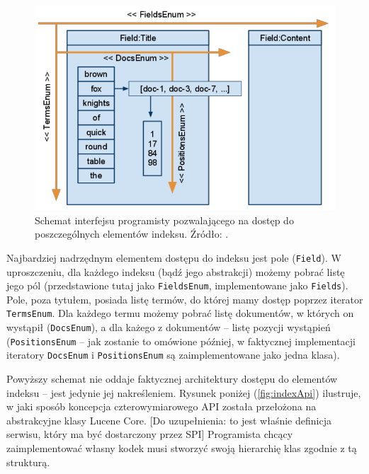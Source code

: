 \begin{figure}[here]
 \includegraphics[scale=0.5]{pictures/api.png}
 \caption{Schemat interfejsu programisty pozwalającego na dostęp do poszczególnych elementów indeksu. Źródło: \cite{flexindex}.\label{fig:4dimAPI}}
\end{figure}

Najbardziej nadrzędnym elementem dostępu do indeksu jest pole (\texttt{Field}). W uproszczeniu, dla każdego indeksu (bądź jego abstrakcji) możemy pobrać listę jego pól (przedstawione tutaj jako \texttt{FieldsEnum}, implementowane jako \texttt{Fields}). Pole, poza tytułem, posiada listę termów, do której mamy dostęp poprzez iterator \texttt{TermsEnum}. Dla każdego termu możemy pobrać listę dokumentów, w których on wystąpił (\texttt{DocsEnum}), a dla każego z dokumentów -- listę pozycji wystąpień (\texttt{PositionsEnum} -- jak zostanie to omówione później, w faktycznej implementacji iteratory \texttt{DocsEnum} i \texttt{PositionsEnum} są zaimplementowane jako jedna klasa).

Powyższy schemat nie oddaje faktycznej architektury dostępu do elementów indeksu -- jest jedynie jej nakreśleniem. Rysunek poniżej (\ref{fig:indexApi}) ilustruje, w jaki sposób koncepcja czterowymiarowego API została przełożona na abstrakcyjne klasy Lucene Core. [Do uzupełnienia: to jest właśnie definicja serwisu, który ma być dostarczony przez SPI] Programista chcący zaimplementować własny kodek musi stworzyć swoją hierarchię klas zgodnie z tą strukturą.

